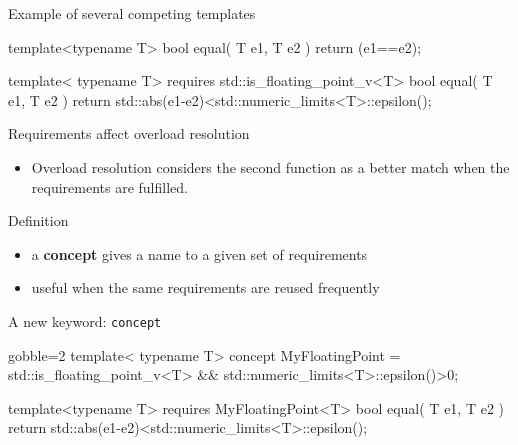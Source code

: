 \begin{frame}[fragile]
  \begin{exampleblock}{Example of several competing templates}
    \small
    \begin{cppcode*}{}
    template<typename T>
    bool equal( T e1, T e2 ) { return (e1==e2); }

    template< typename T>
    requires std::is_floating_point_v<T>
    bool equal( T e1, T e2 )
    {return std::abs(e1-e2)<std::numeric_limits<T>::epsilon();}
    \end{cppcode*}
  \end{exampleblock}
  \begin{block}{Requirements affect overload resolution}
    \begin{itemize}
      \item Overload resolution considers the second function as a better match when the requirements are fulfilled.
    \end{itemize}
  \end{block}
\end{frame}

\begin{frame}[fragile]
    \begin{block}{Definition}
      \begin{itemize}
      \item a \textbf{concept} gives a name to a given set of requirements
      \item useful when the same requirements are reused frequently
      \end{itemize}
    \end{block}
    \begin{exampleblock}{A new keyword: \texttt{concept}}
      \small
      \begin{cppcode*}{gobble=2}
      template< typename T>
      concept MyFloatingPoint =
        std::is_floating_point_v<T> &&
        std::numeric_limits<T>::epsilon()>0;

      template<typename T>
      requires MyFloatingPoint<T>
      bool equal( T e1, T e2 )
      {return std::abs(e1-e2)<std::numeric_limits<T>::epsilon();}
      \end{cppcode*}
    \end{exampleblock}
\end{frame}

